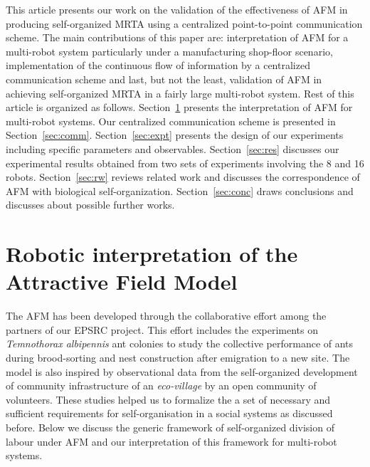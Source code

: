 \documentclass[smallcondensed]{svjour3}
\begin{document}
This article presents our work on the validation of the effectiveness of AFM in producing self-organized MRTA using a centralized point-to-point communication scheme. The main contributions of this paper are: interpretation of AFM for a multi-robot system particularly under a manufacturing shop-floor scenario, implementation of the continuous flow of information by a centralized communication scheme and last, but not the least, validation of AFM in achieving self-organized MRTA in a fairly large multi-robot system. Rest of this article is organized as follows. Section~\ref{sec:afm} presents the interpretation of AFM for multi-robot systems.  Our centralized communication scheme is presented in Section~\ref{sec:comm}. Section~\ref{sec:expt} presents the design of our experiments including specific parameters and observables. Section~\ref{sec:res} discusses our experimental results obtained from two sets of experiments involving the 8 and 16 robots. Section~\ref{sec:rw} reviews related work and discusses the correspondence of AFM with biological self-organization. Section~\ref{sec:conc} draws conclusions and discusses about possible further works.
\section{Robotic interpretation of the Attractive Field Model}
\label{sec:afm}
The AFM has been developed through the collaborative effort among the partners of our EPSRC project. This effort includes the experiments on {\em Temnothorax albipennis} ant colonies to study the collective performance of ants during brood-sorting and nest construction after emigration to a new site.  The model is also inspired by observational data from the self-organized development of community infrastructure of an {\em eco-village} by an open community of volunteers.  These studies helped us to formalize the a set of necessary and sufficient requirements for self-organisation in a social systems as discussed before. Below we discuss the generic framework of self-organized division of labour under AFM and our interpretation of this framework for multi-robot systems.
\end{document}
